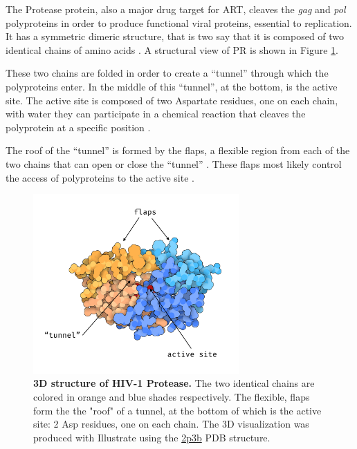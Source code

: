 \documentclass[
  11pt,
  twoside]{scrbook}
\newcommand{\extcaption}[2]{
    \caption[#1]{
        \textbf{#1}\newline
        #2
    }
}
\begin{document}
The Protease protein, also a major drug target for ART, cleaves the \emph{gag} and \emph{pol} polyproteins in order to produce functional viral proteins, essential to replication. It has a symmetric dimeric structure, that is two say that it is composed of two identical chains of amino acids \autocite{pearlStructuralModelRetroviral1987,gulnikHIVProteaseEnzyme2000}. A structural view of PR is shown in Figure \ref{fig:prStruct}.

These two chains are folded in order to create a ``tunnel'' through which the polyproteins enter. In the middle of this ``tunnel'', at the bottom, is the active site. The active site is composed of two Aspartate residues, one on each chain, with water they can participate in a chemical reaction that cleaves the polyprotein at a specific position \autocite{silvaInhibitionCatalyticMechanism1996}.

The roof of the ``tunnel'' is formed by the flaps, a flexible region from each of the two chains that can open or close the ``tunnel'' \autocite{hornakHIV1ProteaseFlaps2006}. These flaps most likely control the access of polyproteins to the active site \autocite{freedbergRapidStructuralFluctuations2002,yuStructuralInsightsHIV12017}.

\begin{figure} 
  \centering 
  \includegraphics[width=0.7\textwidth]{./figures/HIV-Intro/pr.png}      \extcaption{3D structure of HIV-1 Protease.}{The two identical chains are colored in orange and blue shades respectively. The flexible, flaps form the the "roof" of a tunnel, at the bottom of which is the active site: 2 Asp residues, one on each chain. The 3D visualization was produced with Illustrate \autocite{goodsellIllustrateSoftwareBiomolecular2019} using the \href{https://www.rcsb.org/structure/2P3B}{2p3b} PDB structure.}       
  \label{fig:prStruct} 
\end{figure}
\end{document}
